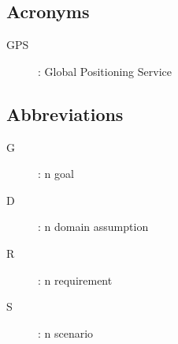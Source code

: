 \documentclass[../../rasd.tex]{subfiles}
\begin{document}
		\subsection{Acronyms}
		\begin{description}
		\item[GPS]: Global Positioning Service
		\end{description}
		\subsection{Abbreviations}
		\begin{description}
			\item[G]: n goal
			\item[D]: n domain assumption
			\item[R]: n requirement
			\item[S]: n scenario
			
		\end{description}
		
\end{document}

